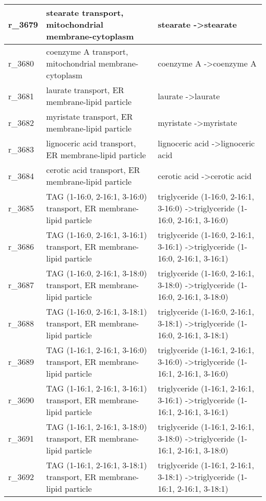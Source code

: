 \begin{landscape}
{\begin{longtable}{|l|p{7cm}|p{15cm}|}
r\_3679 & stearate transport, mitochondrial membrane-cytoplasm & stearate  -\textgreater stearate \\ \hline
r\_3680 & coenzyme A transport, mitochondrial membrane-cytoplasm & coenzyme A  -\textgreater coenzyme A \\ \hline
r\_3681 & laurate transport, ER membrane-lipid particle & laurate  -\textgreater laurate \\ \hline
r\_3682 & myristate transport, ER membrane-lipid particle & myristate  -\textgreater myristate \\ \hline
r\_3683 & lignoceric acid transport, ER membrane-lipid particle & lignoceric acid  -\textgreater lignoceric acid \\ \hline
r\_3684 & cerotic acid transport, ER membrane-lipid particle & cerotic acid  -\textgreater cerotic acid \\ \hline
r\_3685 & TAG (1-16:0, 2-16:1, 3-16:0) transport, ER membrane-lipid particle & triglyceride (1-16:0, 2-16:1, 3-16:0)  -\textgreater triglyceride (1-16:0, 2-16:1, 3-16:0) \\ \hline
r\_3686 & TAG (1-16:0, 2-16:1, 3-16:1) transport, ER membrane-lipid particle & triglyceride (1-16:0, 2-16:1, 3-16:1)  -\textgreater triglyceride (1-16:0, 2-16:1, 3-16:1) \\ \hline
r\_3687 & TAG (1-16:0, 2-16:1, 3-18:0) transport, ER membrane-lipid particle & triglyceride (1-16:0, 2-16:1, 3-18:0)  -\textgreater triglyceride (1-16:0, 2-16:1, 3-18:0) \\ \hline
r\_3688 & TAG (1-16:0, 2-16:1, 3-18:1) transport, ER membrane-lipid particle & triglyceride (1-16:0, 2-16:1, 3-18:1)  -\textgreater triglyceride (1-16:0, 2-16:1, 3-18:1) \\ \hline
r\_3689 & TAG (1-16:1, 2-16:1, 3-16:0) transport, ER membrane-lipid particle & triglyceride (1-16:1, 2-16:1, 3-16:0)  -\textgreater triglyceride (1-16:1, 2-16:1, 3-16:0) \\ \hline
r\_3690 & TAG (1-16:1, 2-16:1, 3-16:1) transport, ER membrane-lipid particle & triglyceride (1-16:1, 2-16:1, 3-16:1)  -\textgreater triglyceride (1-16:1, 2-16:1, 3-16:1) \\ \hline
r\_3691 & TAG (1-16:1, 2-16:1, 3-18:0) transport, ER membrane-lipid particle & triglyceride (1-16:1, 2-16:1, 3-18:0)  -\textgreater triglyceride (1-16:1, 2-16:1, 3-18:0) \\ \hline
r\_3692 & TAG (1-16:1, 2-16:1, 3-18:1) transport, ER membrane-lipid particle & triglyceride (1-16:1, 2-16:1, 3-18:1)  -\textgreater triglyceride (1-16:1, 2-16:1, 3-18:1) \\ \hline

\end{longtable}}
\end{landscape}
